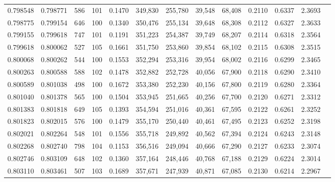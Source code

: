 \begin{tabular}{rrrrrrrrrrrrr}
0.798548 & 0.798771 &   586 & 101 &                                     0.1470 & 349,830 & 255,780 &  39,548 &  68,408 & 0.2110 & 0.6337 & 2.3693 \\
0.798775 & 0.799154 &   646 & 100 &                                     0.1340 & 350,476 & 255,134 &  39,648 &  68,308 & 0.2112 & 0.6327 & 2.3633 \\
0.799155 & 0.799618 &   747 & 101 &                                     0.1191 & 351,223 & 254,387 &  39,749 &  68,207 & 0.2114 & 0.6318 & 2.3564 \\
0.799618 & 0.800062 &   527 & 105 &                                     0.1661 & 351,750 & 253,860 &  39,854 &  68,102 & 0.2115 & 0.6308 & 2.3515 \\
0.800068 & 0.800262 &   544 & 100 &                                     0.1553 & 352,294 & 253,316 &  39,954 &  68,002 & 0.2116 & 0.6299 & 2.3465 \\
0.800263 & 0.800588 &   588 & 102 &                                     0.1478 & 352,882 & 252,728 &  40,056 &  67,900 & 0.2118 & 0.6290 & 2.3410 \\
0.800589 & 0.801038 &   498 & 100 &                                     0.1672 & 353,380 & 252,230 &  40,156 &  67,800 & 0.2119 & 0.6280 & 2.3364 \\
0.801040 & 0.801378 &   565 & 100 &                                     0.1504 & 353,945 & 251,665 &  40,256 &  67,700 & 0.2120 & 0.6271 & 2.3312 \\
0.801383 & 0.801818 &   649 & 105 &                                     0.1393 & 354,594 & 251,016 &  40,361 &  67,595 & 0.2122 & 0.6261 & 2.3252 \\
0.801823 & 0.802015 &   576 & 100 &                                     0.1479 & 355,170 & 250,440 &  40,461 &  67,495 & 0.2123 & 0.6252 & 2.3198 \\
0.802021 & 0.802264 &   548 & 101 &                                     0.1556 & 355,718 & 249,892 &  40,562 &  67,394 & 0.2124 & 0.6243 & 2.3148 \\
0.802268 & 0.802740 &   798 & 104 &                                     0.1153 & 356,516 & 249,094 &  40,666 &  67,290 & 0.2127 & 0.6233 & 2.3074 \\
0.802746 & 0.803109 &   648 & 102 &                                     0.1360 & 357,164 & 248,446 &  40,768 &  67,188 & 0.2129 & 0.6224 & 2.3014 \\
0.803110 & 0.803461 &   507 & 103 &                                     0.1689 & 357,671 & 247,939 &  40,871 &  67,085 & 0.2130 & 0.6214 & 2.2967 \\

\end{tabular}
